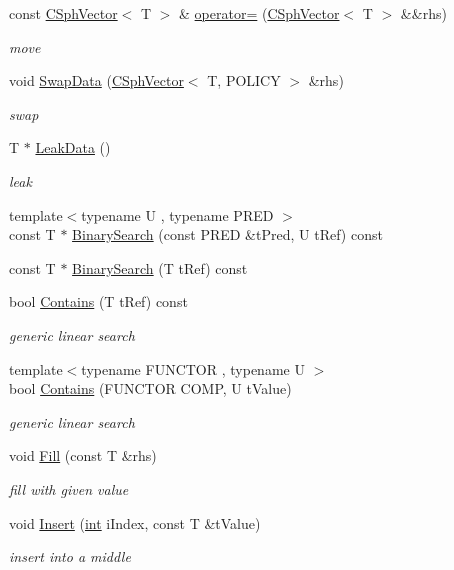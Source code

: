 \begin{DoxyCompactItemize}
const \hyperlink{classCSphVector}{C\-Sph\-Vector}$<$ T $>$ \& \hyperlink{classCSphVector_a7f658e393b88a02ab593efd99da4dfda}{operator=} (\hyperlink{classCSphVector}{C\-Sph\-Vector}$<$ T $>$ \&\&rhs)
\begin{DoxyCompactList}\small\item\em move \end{DoxyCompactList}\item 
void \hyperlink{classCSphVector_ad885cae08002d3717b9fd126c1ee2c4c}{Swap\-Data} (\hyperlink{classCSphVector}{C\-Sph\-Vector}$<$ T, P\-O\-L\-I\-C\-Y $>$ \&rhs)
\begin{DoxyCompactList}\small\item\em swap \end{DoxyCompactList}\item 
T $\ast$ \hyperlink{classCSphVector_ab830d86f6159ce6ef60e31b57c436b7b}{Leak\-Data} ()
\begin{DoxyCompactList}\small\item\em leak \end{DoxyCompactList}\item 
{\footnotesize template$<$typename U , typename P\-R\-E\-D $>$ }\\const T $\ast$ \hyperlink{classCSphVector_a9dca1ae58a4dc6845a82b497388eba9c}{Binary\-Search} (const P\-R\-E\-D \&t\-Pred, U t\-Ref) const 
\item 
const T $\ast$ \hyperlink{classCSphVector_a554c86eb72574ba3c0159f56cca33ddb}{Binary\-Search} (T t\-Ref) const 
\item 
bool \hyperlink{classCSphVector_aba09bed2fa878c51cabb05baf538658c}{Contains} (T t\-Ref) const 
\begin{DoxyCompactList}\small\item\em generic linear search \end{DoxyCompactList}\item 
{\footnotesize template$<$typename F\-U\-N\-C\-T\-O\-R , typename U $>$ }\\bool \hyperlink{classCSphVector_a8a515bc5bf4b2d2f0bf4e2de06fd14dc}{Contains} (F\-U\-N\-C\-T\-O\-R C\-O\-M\-P, U t\-Value)
\begin{DoxyCompactList}\small\item\em generic linear search \end{DoxyCompactList}\item 
void \hyperlink{classCSphVector_a434a432972d71ea41b54895d2e59bd7d}{Fill} (const T \&rhs)
\begin{DoxyCompactList}\small\item\em fill with given value \end{DoxyCompactList}\item 
void \hyperlink{classCSphVector_aeaa7cc2c8e90cf82129333f97ce84475}{Insert} (\hyperlink{sphinxexpr_8cpp_a4a26e8f9cb8b736e0c4cbf4d16de985e}{int} i\-Index, const T \&t\-Value)
\begin{DoxyCompactList}\small\item\em insert into a middle \end{DoxyCompactList}\end{DoxyCompactItemize}
